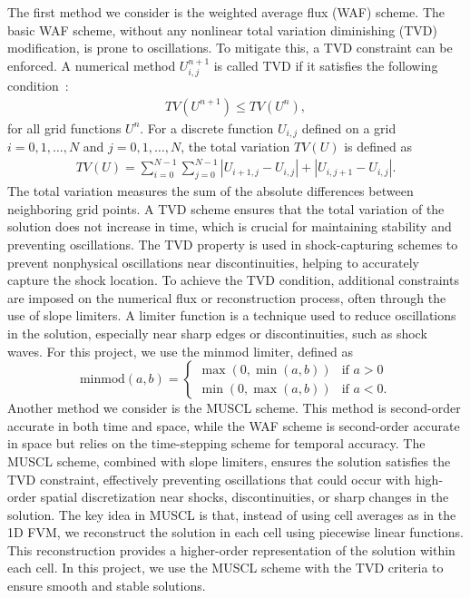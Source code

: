 The first method we consider is the weighted average flux (WAF) scheme.
The basic WAF scheme, without any nonlinear total variation diminishing (TVD) modification, is prone to oscillations.
To mitigate this, a TVD constraint can be enforced.
A numerical method $U_{i,j}^{n+1} $ is called TVD if it satisfies the following condition~\cite{LeVeque_1992}:
\begin{align}
    TV(U^{n+1}) \leq TV(U^n),
\end{align}
for all grid functions $U^n$. 
For a discrete function $U_{i,j}$ defined on a grid $i = 0,1, \dots, N$ and $j=0,1, \dots, N$, the total variation $TV(U)$ is defined as
\begin{align}
    TV(U) = \sum_{i=0}^{N-1} \sum_{j=0}^{N-1}  |U_{i+1,j} - U_{i,j}| + |U_{i,j+1} - U_{i,j}|.
\end{align}
The total variation measures the sum of the absolute differences between neighboring grid points.
A TVD scheme ensures that the total variation of the solution does not increase in time, which is crucial for maintaining stability and preventing oscillations.
The TVD property is used in shock-capturing schemes to prevent nonphysical oscillations near discontinuities, helping to accurately capture the shock location.
To achieve the TVD condition, additional constraints are imposed on the numerical flux or reconstruction process, often through the use of slope limiters.
A limiter function is a technique used to reduce oscillations in the solution, especially near sharp edges or discontinuities, such as shock waves.
For this project, we use the minmod limiter, defined as
\begin{equation*}
    \text{minmod}(a,b) = 
    \begin{cases}
        \max(0, \min(a,b)) & \text{if } a > 0 \\
        \min(0, \max(a,b)) & \text{if } a < 0. 
    \end{cases}
\end{equation*}
Another method we consider is the MUSCL scheme.
This method is second-order accurate in both time and space, while the WAF scheme is second-order accurate in space but relies on the time-stepping scheme for temporal accuracy.
The MUSCL scheme, combined with slope limiters, ensures the solution satisfies the TVD constraint, effectively preventing oscillations that could occur with high-order spatial discretization near shocks, discontinuities, or sharp changes in the solution.
The key idea in MUSCL is that, instead of using cell averages as in the 1D FVM, we reconstruct the solution in each cell using piecewise linear functions.
This reconstruction provides a higher-order representation of the solution within each cell.
In this project, we use the MUSCL scheme with the TVD criteria to ensure smooth and stable solutions.

